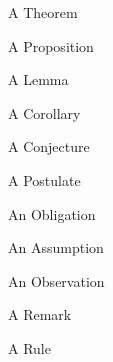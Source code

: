 \documentclass[minimal]{omdoc}
\begin{document}
\begin{assertion}[type=theorem]
  A Theorem
\end{assertion}

\begin{assertion}[type=proposition]
  A Proposition
\end{assertion}

\begin{assertion}[type=lemma]
  A Lemma
\end{assertion}

\begin{assertion}[type=corollary]
  A Corollary
\end{assertion}

\begin{assertion}[type=conjecture]
  A Conjecture
\end{assertion}

\begin{assertion}[type=postulate]
  A Postulate
\end{assertion}

\begin{assertion}[type=obligation]
  An Obligation
\end{assertion}

\begin{assertion}[type=assumption]
  An Assumption
\end{assertion}

\begin{assertion}[type=observation]
  An Observation
\end{assertion}

\begin{assertion}[type=remark]
  A Remark
\end{assertion}

\begin{assertion}[type=rule]
  A Rule
\end{assertion}
\end{document}
